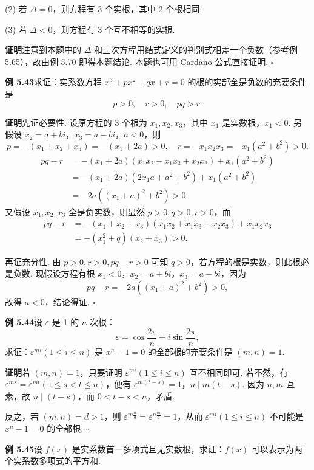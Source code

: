 \documentclass[UTF8, 12pt, fontset=fandol, oneside]{ctexart}
\begin{document}
(2) 若 $\Delta=0$，则方程有 3 个实根，其中 2 个根相同;

(3) 若 $\Delta<0$，则方程有 3 个互不相等的实根.

\noindent\textbf{证明}\quad 注意到本题中的 $\Delta$ 和三次方程用结式定义的判别式相差一个负数（参考例 5.65），故由例 5.70 即得本题结论. 本题也可用 Cardano 公式直接证明. \hfill $\square$

\noindent\textbf{例 5.43}\quad 求证：实系数方程 $x^3+px^2+qx+r=0$ 的根的实部全是负数的充要条件是
\[
p>0,\quad r>0,\quad pq>r.
\]

\noindent\textbf{证明}\quad 先证必要性. 设原方程的 3 个根为 $x_1,x_2,x_3$，其中 $x_1$ 是实数根，$x_1<0$. 另假设 $x_2=a+bi$，$x_3=a-bi$，$a<0$，则
\[
p=-(x_1+x_2+x_3)=-(x_1+2a)>0,\quad
r=-x_1x_2x_3=-x_1(a^2+b^2)>0.
\]
\[
\begin{aligned}
pq-r
&=-(x_1+2a)(x_1x_2+x_1x_3+x_2x_3)+x_1(a^2+b^2)\\
&=-(x_1+2a)(2x_1a+a^2+b^2)+x_1(a^2+b^2)\\
&=-2a((x_1+a)^2+b^2)>0.
\end{aligned}
\]
又假设 $x_1,x_2,x_3$ 全是负实数，则显然 $p>0,q>0,r>0$，而
\[
\begin{aligned}
pq-r
&=-(x_1+x_2+x_3)(x_1x_2+x_1x_3+x_2x_3)+x_1x_2x_3\\
&=-(x_1^2+q)(x_2+x_3)>0.
\end{aligned}
\]

再证充分性. 由 $p>0,r>0,pq-r>0$ 可知 $q>0$，若方程的根是实数，则此根必是负数. 现假设方程有根 $x_1<0$，$x_2=a+bi$，$x_3=a-bi$，因为
\[
pq-r=-2a((x_1+a)^2+b^2)>0,
\]
故得 $a<0$，结论得证. \hfill $\square$

\noindent\textbf{例 5.44}\quad 设 $\varepsilon$ 是 1 的 $n$ 次根：
\[
\varepsilon=\cos\frac{2\pi}{n}+i\sin\frac{2\pi}{n},
\]
求证：$\varepsilon^{mi}(1\le i\le n)$ 是 $x^n-1=0$ 的全部根的充要条件是 $(m,n)=1$.

\noindent\textbf{证明}\quad 若 $(m,n)=1$，只要证明 $\varepsilon^{mi}(1\le i\le n)$ 互不相同即可. 若不然，有 $\varepsilon^{ms}=\varepsilon^{mt}(1\le s<t\le n)$，便有 $\varepsilon^{m(t-s)}=1$，$n\mid m(t-s)$. 因为 $n,m$ 互素，故 $n\mid (t-s)$，而 $0<t-s<n$，矛盾.

反之，若 $(m,n)=d>1$，则 $\varepsilon^{m\frac{n}{d}}=\varepsilon^{n\frac{m}{d}}=1$，从而 $\varepsilon^{mi}(1\le i\le n)$ 不可能是 $x^n-1=0$ 的全部根. \hfill $\square$

\noindent\textbf{例 5.45}\quad 设 $f(x)$ 是实系数首一多项式且无实数根，求证：$f(x)$ 可以表示为两个实系数多项式的平方和.
\end{document}
